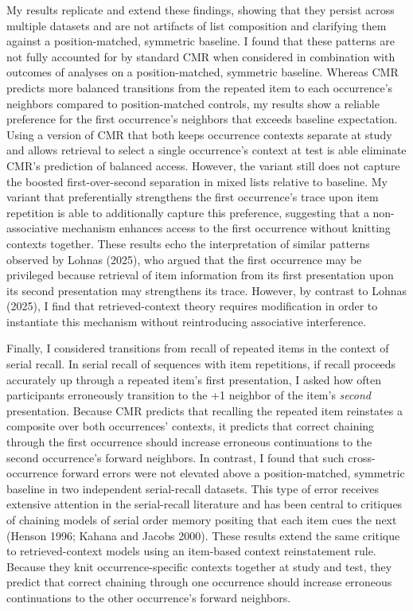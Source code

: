 \documentclass[
  letterpaper,
  11pt,
  english,
  singlespacing,
  headsepline]{MastersDoctoralThesis}
\begin{document}
My results replicate and extend these findings, showing that they
persist across multiple datasets and are not artifacts of list
composition and clarifying them against a position-matched, symmetric
baseline. I found that these patterns are not fully accounted for by
standard CMR when considered in combination with outcomes of analyses on
a position-matched, symmetric baseline. Whereas CMR predicts more
balanced transitions from the repeated item to each occurrence's
neighbors compared to position-matched controls, my results show a
reliable preference for the first occurrence's neighbors that exceeds
baseline expectation. Using a version of CMR that both keeps occurrence
contexts separate at study and allows retrieval to select a single
occurrence's context at test is able eliminate CMR's prediction of
balanced access. However, the variant still does not capture the boosted
first-over-second separation in mixed lists relative to baseline. My
variant that preferentially strengthens the first occurrence's trace
upon item repetition is able to additionally capture this preference,
suggesting that a non-associative mechanism enhances access to the first
occurrence without knitting contexts together. These results echo the
interpretation of similar patterns observed by Lohnas (2025), who argued
that the first occurrence may be privileged because retrieval of item
information from its first presentation upon its second presentation may
strengthens its trace. However, by contrast to Lohnas (2025), I find
that retrieved-context theory requires modification in order to
instantiate this mechanism without reintroducing associative
interference.

Finally, I considered transitions from recall of repeated items in the
context of serial recall. In serial recall of sequences with item
repetitions, if recall proceeds accurately up through a repeated item's
first presentation, I asked how often participants erroneously
transition to the +1 neighbor of the item's \emph{second} presentation.
Because CMR predicts that recalling the repeated item reinstates a
composite over both occurrences' contexts, it predicts that correct
chaining through the first occurrence should increase erroneous
continuations to the second occurrence's forward neighbors. In contrast,
I found that such cross-occurrence forward errors were not elevated
above a position-matched, symmetric baseline in two independent
serial-recall datasets. This type of error receives extensive attention
in the serial-recall literature and has been central to critiques of
chaining models of serial order memory positing that each item cues the
next (Henson 1996; Kahana and Jacobs 2000). These results extend the
same critique to retrieved-context models using an item-based context
reinstatement rule. Because they knit occurrence-specific contexts
together at study and test, they predict that correct chaining through
one occurrence should increase erroneous continuations to the other
occurrence's forward neighbors.
\end{document}
